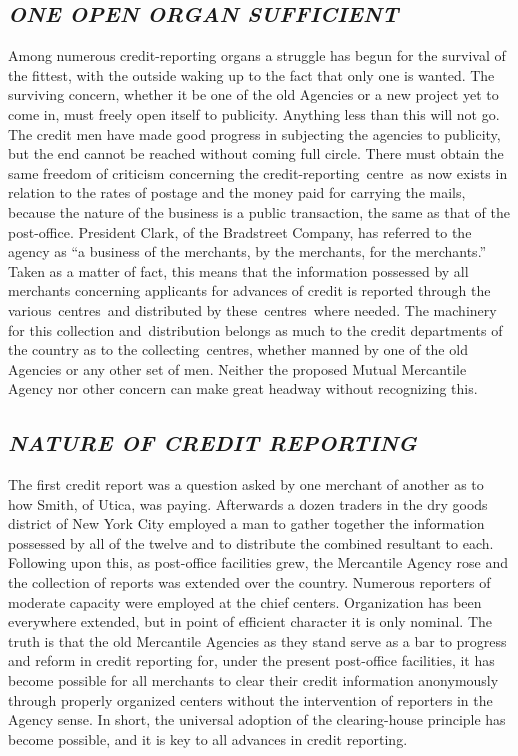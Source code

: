 \documentclass[openany,nobib]{tufte-book}
\begin{document}
\hypertarget{one-open-organ-sufficient}{%
\subsection{\texorpdfstring{\emph{ONE OPEN ORGAN
SUFFICIENT}}{ONE OPEN ORGAN SUFFICIENT}}\label{one-open-organ-sufficient}}

Among numerous credit-reporting organs a struggle has begun for the
survival of the fittest, with the outside waking up to the fact that
only one is wanted. The surviving concern, whether it be one of the old
Agencies or a new project yet to come in, must freely open itself to
publicity. Anything less than this will not go. The credit men have made
good progress in subjecting the agencies to publicity, but the end
cannot be reached without coming full circle. There must obtain the same
freedom of criticism concerning the credit-reporting~centre~as now
exists in relation to the rates of postage and the money paid for
carrying the mails, because the nature of the business is a public
transaction, the same as that of the post-office. President Clark, of
the Bradstreet Company, has referred to the agency as ``a business of
the merchants, by the merchants, for the merchants.'' Taken as a matter
of fact, this means that the information possessed by all merchants
concerning applicants for advances of credit is reported through the
various~centres~and distributed by these~centres~where needed. The
machinery for this collection and~distribution belongs as much to the
credit departments of the country as to the collecting~centres, whether
manned by one of the old Agencies or any other set of men. Neither the
proposed Mutual Mercantile Agency nor other concern can make great
headway without recognizing this.~

\hypertarget{nature-of-credit-reporting}{%
\subsection{\texorpdfstring{\emph{NATURE OF CREDIT
REPORTING}}{NATURE OF CREDIT REPORTING}}\label{nature-of-credit-reporting}}

The first credit report was a question asked by one merchant of another
as to how Smith, of Utica, was paying. Afterwards a dozen traders in the
dry goods district of New York City employed a man to gather together
the information possessed by all of the twelve and to distribute the
combined resultant to each. Following upon this, as post-office
facilities grew, the Mercantile Agency rose and the collection of
reports was extended over the country. Numerous reporters of moderate
capacity were employed at the chief centers. Organization has been
everywhere extended, but in point of efficient character it is only
nominal. The truth is that the old Mercantile Agencies as they stand
serve as a bar to progress and reform in credit reporting for, under the
present post-office facilities, it has become possible for all merchants
to clear their credit information anonymously through properly organized
centers without the intervention of reporters in the Agency sense. In
short, the universal adoption of the clearing-house principle has become
possible, and it is key to all advances in credit reporting.~
\end{document}
